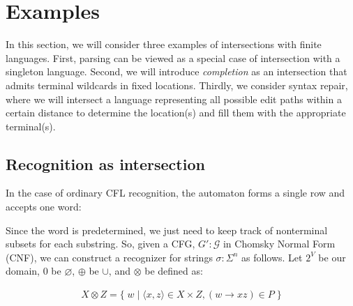 \documentclass[sigplan,acmsmall,nonacm,screen]{acmart}\settopmatter{printfolios=false,printccs=false,printacmref=false}
\begin{document}
\section{Examples}

In this section, we will consider three examples of intersections with finite languages. First, parsing can be viewed as a special case of intersection with a singleton language. Second, we will introduce \textit{completion} as an intersection that admits terminal wildcards in fixed locations. Thirdly, we consider syntax repair, where we will intersect a language representing all possible edit paths within a certain distance to determine the location(s) and fill them with the appropriate terminal(s).

\subsection{Recognition as intersection}

In the case of ordinary CFL recognition, the automaton forms a single row and accepts one word:

\begin{figure}[H]
\end{figure}

Since the word is predetermined, we just need to keep track of nonterminal subsets for each substring. So, given a CFG, $G' : \mathcal{G}$ in Chomsky Normal Form (CNF), we can construct a recognizer for strings $\sigma: \Sigma^n$ as follows. Let $2^V$ be our domain, $0$ be $\varnothing$, $\oplus$ be $\cup$, and $\otimes$ be defined as:\vspace{-10pt}

\begin{align}
  X \otimes Z = \big\{\;w \mid \langle x, z\rangle \in X \times Z, (w\rightarrow xz) \in P\;\big\}
\end{align}
\end{document}
